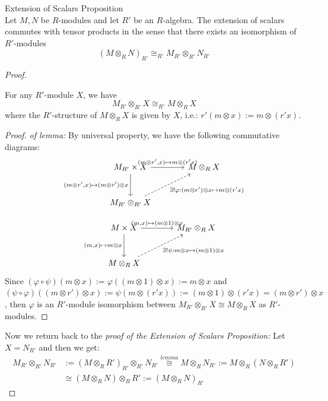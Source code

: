\begin{proposition}{Extension of Scalars Proposition}\\
Let $M,N$ be $R$-modules and let $R'$ be an $R$-algebra. The extension of scalars commutes with tensor products in the sense that there exists an isomorphism of $R'$-modules
$$(M \otimes_R N)_{R'} \cong_{R'} M_{R'} \otimes _{R'} N_{R'}$$
\end{proposition}

\begin{proof}
    \begin{lemma}
        For any $R'$-module $X$, we have
        $$M_{R'} \otimes_{R'} X \cong_{R'} M \otimes_R X$$
        where the $R'$-structure of $M \otimes _RX$ is given by $X$, i.e.: $r' (m \otimes x) := m \otimes (r'x)$.
    \end{lemma}

    \begin{proof}
        \textit{of lemma:} By universal property, we have the following commutative diagrams:
        \[
        \begin{tikzcd}[row sep=large, column sep=large]
        M_{R'} \times X \arrow[r, "{(m \otimes r',x)} \mapsto m \otimes (r'x)"] \arrow[d, "{(m \otimes r',x)} \mapsto (m\otimes r') \otimes x"'] & M \otimes_RX \\
        M_{R'} \otimes_{R'}X \arrow[ur, dashed, "\exists! \varphi: (m\otimes r') \otimes x \mapsto m \otimes (r'x)"'] & 
        \end{tikzcd}
        \]

        \[
        \begin{tikzcd}[row sep=large, column sep=large]
        M \times X \arrow[r, "{(m,x)} \mapsto (m \otimes 1) \otimes x"] \arrow[d, "{(m,x)} \mapsto m\otimes x"'] & M_{R'} \otimes_RX \\
        M \otimes_{R}X \arrow[ur, dashed, "\exists! \psi: m\otimes x \mapsto (m \otimes 1) \otimes x"'] & 
        \end{tikzcd}
        \]
        Since $(\varphi \circ \psi) (m \otimes x) := \varphi((m \otimes 1) \otimes x):= m \otimes x$ and $(\psi \circ \varphi) ((m \otimes r') \otimes x) := \psi (m \otimes (r'x)) := (m \otimes 1) \otimes (r'x) = (m \otimes r') \otimes x$, then $\varphi$ is an $R'$-module isomorphism between $M_{R'} \otimes _{R'}X \cong M \otimes _RX$ as $R'$-modules.
    \end{proof}

    Now we return back to the \textit{proof of the Extension of Scalars Proposition:} Let $X= N_{R'}$ and then we get:
    \begin{align*}
        M_{R'} \otimes_{R'} N_{R'} &:= (M \otimes_R R')_{R'} \otimes_{R'} N_{R'} \overset{lemma}{\cong} M \otimes_R N_{R'} := M \otimes _R(N \otimes_R R')\\
        &\cong (M \otimes_RN) \otimes_R R' := (M \otimes_R N)_{R'}
    \end{align*}
\end{proof}

